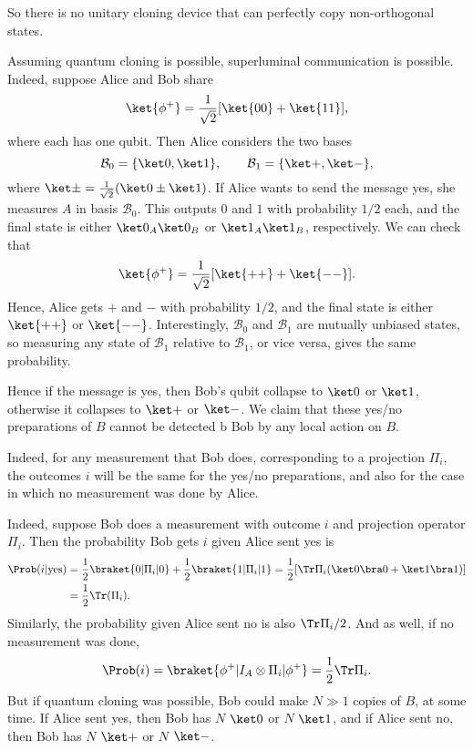 \documentclass[12pt]{article}
\begin{document}
So there is no unitary cloning device that can perfectly copy non-orthogonal states.

Assuming quantum cloning is possible, superluminal communication is possible. Indeed, suppose Alice and Bob share
\[
	\ket{\phi^+} = \frac{1}{\sqrt 2}[\ket{00} + \ket{11}],
\]
where each has one qubit. Then Alice considers the two bases
\[
	\mathcal{B}_0 = \{\ket 0, \ket 1\}, \qquad \mathcal{B}_1 = \{\ket +, \ket - \},
\]
where $\ket \pm = \frac{1}{\sqrt 2}(\ket 0 \pm \ket 1)$. If Alice wants to send the message yes, she measures $A$ in basis $\mathcal{B}_0$. This outputs $0$ and $1$ with probability $1/2$ each, and the final state is either $\ket 0_A \ket 0_B$ or $\ket 1_A \ket 1_B$, respectively. We can check that
\[
	\ket{\phi^+} = \frac{1}{\sqrt 2}[\ket{++} + \ket{--}].
\]
Hence, Alice gets $+$ and $-$ with probability $1/2$, and the final state is either $\ket{++}$ or $\ket{--}$. Interestingly, $\mathcal{B}_0$ and $\mathcal{B}_1$ are mutually unbiased states, so measuring any state of $\mathcal{B}_1$ relative to $\mathcal{B}_1$, or vice versa, gives the same probability.

Hence if the message is yes, then Bob's qubit collapse to $\ket 0$ or $\ket 1$, otherwise it collapses to $\ket +$ or $\ket -$. We claim that these yes/no preparations of $B$ cannot be detected b Bob by any local action on $B$.

Indeed, for any measurement that Bob does, corresponding to a projection $\Pi_i$, the outcomes $i$ will be the same for the yes/no preparations, and also for the case in which no measurement was done by Alice.


Indeed, suppose Bob does a measurement with outcome $i$ and projection operator $\Pi_i$. Then the probability Bob gets $i$ given Alice sent yes is
\begin{align*}
	\Prob(i | \text{yes}) &= \frac{1}{2} \braket{0|\Pi_i|0} + \frac{1}{2} \braket{1|\Pi_i|1}  = \frac{1}{2} [\Tr\Pi_i(\ket 0 \bra 0 + \ket 1 \bra 1)] \\
			      &= \frac{1}{2} \Tr(\Pi_i).
\end{align*}
Similarly, the probability given Alice sent no is also $\Tr \Pi_i/2$. And as well, if no measurement was done,
\[
	\Prob(i) = \braket{\phi^{+} | I_A \otimes \Pi_i | \phi^+} = \frac{1}{2} \Tr \Pi_i.
\]
But if quantum cloning was possible, Bob could make $N \gg 1$ copies of $B$, at some time. If Alice sent yes, then Bob has $N$ $\ket 0$ or $N$ $\ket 1$, and if Alice sent no, then Bob has $N$ $\ket +$ or $N$ $\ket -$.
\end{document}
